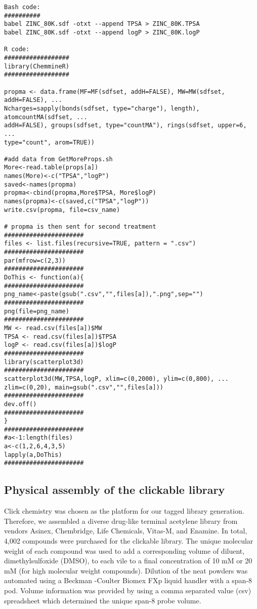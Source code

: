\begin{verbatim}
Bash code:
##########
babel ZINC_80K.sdf -otxt --append TPSA > ZINC_80K.TPSA
babel ZINC_80K.sdf -otxt --append logP > ZINC_80K.logP

R code:
##################
library(ChemmineR)
##################

propma <- data.frame(MF=MF(sdfset, addH=FALSE), MW=MW(sdfset, addH=FALSE), ...
Ncharges=sapply(bonds(sdfset, type="charge"), length), atomcountMA(sdfset, ...
addH=FALSE), groups(sdfset, type="countMA"), rings(sdfset, upper=6, ...
type="count", arom=TRUE))
    
#add data from GetMoreProps.sh
More<-read.table(props[a])
names(More)<-c("TPSA","logP")
saved<-names(propma)
propma<-cbind(propma,More$TPSA, More$logP)
names(propma)<-c(saved,c("TPSA","logP"))
write.csv(propma, file=csv_name)

# propma is then sent for second treatment
######################
files <- list.files(recursive=TRUE, pattern = ".csv")
######################
par(mfrow=c(2,3)) 
######################
DoThis <- function(a){
######################
png_name<-paste(gsub(".csv","",files[a]),".png",sep="")
######################
png(file=png_name)
######################
MW <- read.csv(files[a])$MW
TPSA <- read.csv(files[a])$TPSA
logP <- read.csv(files[a])$logP
######################
library(scatterplot3d)
######################
scatterplot3d(MW,TPSA,logP, xlim=c(0,2000), ylim=c(0,800), ...
zlim=c(0,20), main=gsub(".csv","",files[a]))
######################
dev.off()
######################
}
######################
#a<-1:length(files)
a<-c(1,2,6,4,3,5)
lapply(a,DoThis)
######################
\end{verbatim}
\clearpage


\subsection{Physical assembly of the clickable library}

Click chemistry was chosen as the platform for our tagged library generation. Therefore, we assembled a diverse drug-like terminal acetylene library from vendors Asinex, Chembridge, Life Chemicals, Vitas-M, and Enamine. In total, 4,002 compounds were purchased for the clickable library. The unique molecular weight of each compound was used to add a corresponding volume of diluent, dimethylsulfoxide (DMSO), to each vile to a final concentration of 10 mM or 20 mM (for high molecular weight compounds). Dilution of the neat powders was automated using a Beckman -Coulter Biomex FXp liquid handler with a span-8 pod. Volume information was provided by using a comma separated value (csv) spreadsheet which determined the unique span-8 probe volume.

